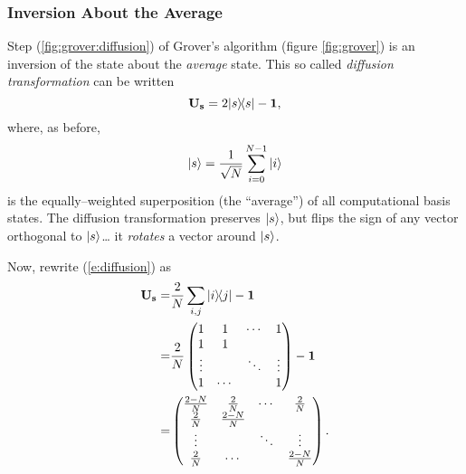 \subsubsection{Inversion About the Average}
\label{ssec:diffusion}

Step (\ref{fig:grover:diffusion}) of Grover's algorithm
(figure \ref{fig:grover}) is an inversion of the state about
the {\sl average} state.  This so called 
\emph{diffusion transformation}
can be written
\begin{equation}
{\bf U_s} = 2{|{s}\rangle\!\langle{s}|} - {\bf 1},
\label{e:diffusion}
\end{equation}
where, as before, 
\begin{equation}
{|{s}\rangle} = \frac{1}{\sqrt{N}}\sum_{i=0}^{N-1} {|{i}\rangle}
\end{equation}
is the equally--weighted
superposition (the ``average'') of all computational basis states.
The diffusion transformation preserves ${|{s}\rangle}$, but flips 
the sign of any vector orthogonal to ${|{s}\rangle}$\dots
it \emph{rotates} a vector around ${|{s}\rangle}$.

Now, rewrite (\ref{e:diffusion}) as
\begin{equation}
\begin{split}
{\bf U_s} =& \frac{2}{N}\sum_{i,j} {|{i}\rangle\!\langle{j}|} - {\bf 1}\\
=& \frac{2}{N}\begin{pmatrix}
                    1 & 1 & \cdots & 1 \\
                    1 & 1 & &  \\
                    \vdots &  & \ddots & \vdots \\
                    1 & \cdots && 1 
              \end{pmatrix} - {\bf 1} \\
=& \begin{pmatrix}
    \frac{2-N}{N} & \frac{2}{N} & \cdots & \frac{2}{N} \\
    \frac{2}{N}   & \frac{2-N}{N} & &  \\
    \vdots &  & \ddots & \vdots \\
    \frac{2}{N}   & \cdots && \frac{2-N}{N} 
\end{pmatrix}.
\end{split}
\end{equation}

